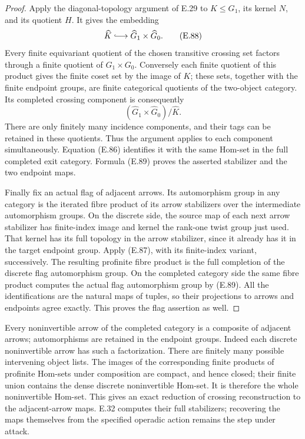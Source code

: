 \begin{proof}
Apply the diagonal-topology argument of E.29 to
$K\leq G_1$, its kernel $N$, and its quotient $H$.
It gives the embedding
\[
          \widehat K\lhook\joinrel\longrightarrow
                    \widehat G_1\times\widehat G_0.           \tag{E.88}
\]
Every finite equivariant quotient of the chosen transitive
crossing set factors through a finite quotient of
$G_1\times G_0$.  Conversely each finite quotient of this
product gives the finite coset set by the image of $K$;
these sets, together with the finite endpoint groups, are
finite categorical quotients of the two-object category.
Its completed crossing component is consequently
\[
       (\widehat G_1\times\widehat G_0)/\widehat K.             \tag{E.89}
\]
There are only finitely many incidence components, and
their tags can be retained in these quotients.  Thus the
argument applies to each component simultaneously.
Equation (E.86) identifies it with the same Hom-set in
the full completed exit category.  Formula (E.89) proves
the asserted stabilizer and the two endpoint maps.

Finally fix an actual flag of adjacent arrows.  Its
automorphism group in any category is the iterated fibre
product of its arrow stabilizers over the intermediate
automorphism groups.  On the discrete side, the source map
of each next arrow stabilizer has finite-index image and
kernel the rank-one twist group just used.  That kernel
has its full topology in the arrow stabilizer, since it
already has it in the target endpoint group.
Apply (E.87), with its finite-index variant, successively.
The resulting profinite fibre product is the full completion
of the discrete flag automorphism group.  On the completed
category side the same fibre product computes the actual
flag automorphism group by (E.89).  All the identifications
are the natural maps of tuples, so their projections to
arrows and endpoints agree exactly.  This proves the flag
assertion as well.
\end{proof}

Every noninvertible arrow of the completed category is a
composite of adjacent arrows; automorphisms are retained in
the endpoint groups.  Indeed each discrete noninvertible arrow has such a
factorization.  There are finitely many possible intervening
object lists.  The images of the corresponding finite
products of profinite Hom-sets under composition are compact,
and hence closed; their finite union contains the dense
discrete noninvertible Hom-set.  It is therefore the whole
noninvertible Hom-set.
This gives an exact reduction of crossing reconstruction
to the adjacent-arrow maps.  E.32 computes their full
stabilizers; recovering the maps themselves from the
specified operadic action remains the step under attack.
